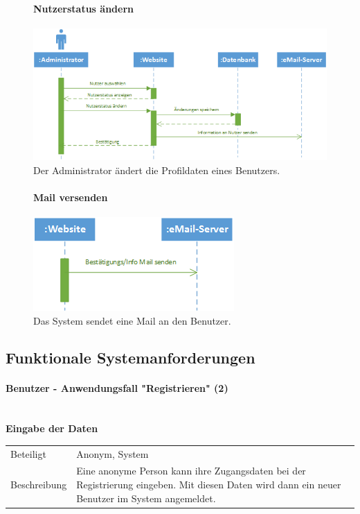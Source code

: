 \documentclass[12pt,a4paper]{article}
\begin{document}
\begin{figure}[H]
	\centering
	\paragraph{Nutzerstatus ändern}
	\includegraphics[width=\textwidth]{Bilder/Sequenzdiagramme/NutzerstatusAendern.png}
	\caption{Der Administrator ändert die Profildaten eines Benutzers.}
	\label{SzNutzerstatusAendern}
\end{figure}

\begin{figure}[H]
	\centering
	\paragraph{Mail versenden}
	\includegraphics[width=\textwidth]{Bilder/Sequenzdiagramme/MailVersenden.png}
	\caption{Das System sendet eine Mail an den Benutzer.}
	\label{SzMailVersenden}
\end{figure}

\subsection{Funktionale Systemanforderungen}
\paragraph{Benutzer - Anwendungsfall "Registrieren" (2)}\mbox{}\\
\textbf{Eingabe der Daten}\\
\begin{tabular}{l| p{12cm}}
	\hline 
	Beteiligt & Anonym, System \\ 
	Beschreibung & Eine anonyme Person kann ihre Zugangsdaten bei der Registrierung eingeben. Mit diesen Daten wird dann ein neuer Benutzer im System angemeldet.\\ 
\end{tabular}\\
\end{document}
